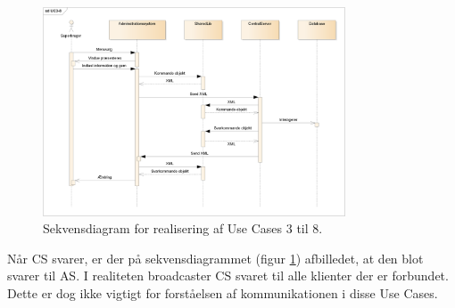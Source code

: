 \begin{figure}[H]
    \centering
    \includegraphics[width=0.8\textwidth]{Systemarkitektur/LogiskView/Realiseringer/Images/UC38.png}
    \caption{Sekvensdiagram for realisering af Use Cases 3 til 8.}
    \label{fig:uc38sq}
\end{figure}

Når \gls{CS} svarer, er der på sekvensdiagrammet (figur \ref{fig:uc38sq}) afbilledet, at den blot svarer til \gls{AS}. I realiteten broadcaster \gls{CS} svaret til alle klienter der er forbundet. Dette er dog ikke vigtigt for forståelsen af kommunikationen i disse Use Cases.